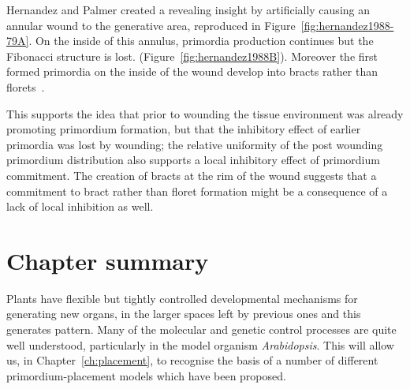 

Hernandez and Palmer created a  revealing insight by artificially causing an annular wound to the generative area, reproduced in Figure~\ref{fig:hernandez1988-79A}\autocite{hernandezRegenerationSunflowerCapitulum1988}. On the inside of this annulus, primordia production continues but the Fibonacci structure is lost. (Figure~\ref{fig:hernandez1988B}). Moreover the first formed primordia on the inside of the wound develop into bracts rather than florets~\autocite{hernandezRegenerationSunflowerCapitulum1988}.%
\clearpage
{}
{\autocite{hernandezRegenerationSunflowerCapitulum1988}}%

This supports the idea that prior to wounding the tissue environment was already promoting primordium formation, but that the inhibitory effect of earlier primordia was lost by wounding; the relative uniformity of the post wounding primordium distribution also supports a local inhibitory effect of primordium commitment. The creation of bracts at the rim of the wound suggests that a commitment to bract rather than floret formation might be a consequence of a lack of local inhibition as well. 


\clearpage
  \section{Chapter summary}
  Plants have flexible but tightly controlled developmental mechanisms for generating new organs, in the larger spaces left by previous ones and this generates pattern. Many of the molecular and genetic control processes are quite well understood, particularly in the model organism \textit{Arabidopsis}. This will allow us, in Chapter~\ref{ch:placement}, to recognise the basis of a number of different primordium-placement models which have been proposed. 
 

